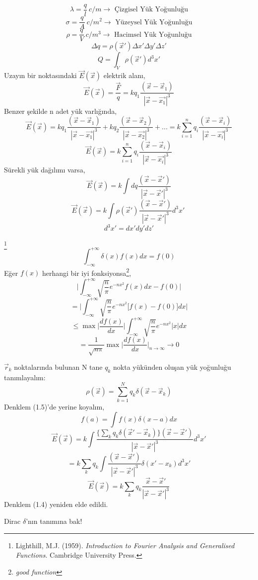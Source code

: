 \begin{theorem}
  \[  \lambda = \dfrac{q}{l} \ c/m  \rightarrow \textrm{ Çizgisel Yük Yoğunluğu}\] 
  \[  \sigma = \dfrac{q}{A} \ c/m^{2}  \rightarrow \textrm{ Yüzeysel Yük Yoğunluğu}\]
  \[  \rho = \dfrac{q}{V} \ c/m^{3} \rightarrow \textrm{ Hacimsel Yük Yoğunluğu} \]
  \[ \Delta q = \rho (\Vec{x}') \Delta x' \Delta y' \Delta z' \]
  \[ Q = \int_{V}  \rho (\Vec{x}') d^{3} x'  \]
Uzayın bir noktasındaki $\Vec{E} (\Vec{x})$ elektrik alanı,
 \[ \Vec{E} (\Vec{x}) = \dfrac{\Vec{F}}{q} = k q_{1} \dfrac{( \Vec{x} - \Vec{x}_{1})}{| \Vec{x} - \Vec{x_{1}}|^{3}} \]
Benzer şekilde n adet yük varlığında,
  \[ \Vec{E} (\Vec{x}) = k q_{1} \dfrac{( \Vec{x} - \Vec{x}_{1})}{| \Vec{x} - \Vec{x_{1}}|^{3}} + k q_{2} \dfrac{( \Vec{x} - \Vec{x}_{2})}{| \Vec{x} - \Vec{x_{2}}|^{3}} + ... =  k \sum_{i = 1}^{n} q_{i} \dfrac{( \Vec{x} - \Vec{x}_{i})}{| \Vec{x} - \Vec{x_{i}}|^{3}} \]
  \[ \Vec{E} (\Vec{x}) = k \sum_{i = 1}^{n} q_{i} \dfrac{( \Vec{x} - \Vec{x}_{i})}{| \Vec{x} - \Vec{x_{i}}|^{3}}\]
Sürekli yük dağılımı varsa,
\[   \Vec{E} (\Vec{x}) = k \int dq \dfrac{( \Vec{x} - \Vec{x}')}{| \Vec{x} - \Vec{x}'|^{3}}  \]
\[ \Vec{E} (\Vec{x}) = k \int \rho(\Vec{x}') \dfrac{( \Vec{x} - \Vec{x}')}{| \Vec{x} - \Vec{x}'|^{3}} d^{3} x' \ \tag{1.5}  \]
\[ d^{3} x' = dx' dy' dz' \]
\end{theorem}

\begin{definition} \footnote{Lighthill, M.J. (1959). \textit{Introduction to Fourier Analysis and Generalised Functions}. Cambridge University Press.}
\[ \int_{-\infty}^{+ \infty} \delta(x) f(x) dx = f (0) \]
Eğer $f(x)$ herhangi bir iyi fonksiyonsa\footnote{\textit{good function}},
\[ \Big| \int_{-\infty}^{+ \infty}  \sqrt{\dfrac{n}{\pi}} e^{-n x^{2}} f(x) dx - f(0) \Big| \]
\[ = \Big| \int_{-\infty}^{+ \infty}  \sqrt{\dfrac{n}{\pi}} e^{-n x^{2}} \big[ f(x) - f(0) \big] dx \Big|  \]
\[ \leq \max \Big| \dfrac{d f(x)}{dx} \Big| \int_{-\infty}^{+ \infty} \sqrt{\dfrac{n}{\pi}}  e^{-n x^{2}} |x| dx \]
\[ = \dfrac{1}{\sqrt{n \pi}} \max \Big| \dfrac{d f(x)}{dx} \Big|_{n \rightarrow \infty} \rightarrow 0 \]
\end{definition}

\begin{theorem}
$\Vec{r}_{k}$ noktalarında bulunan N tane $q_{k}$ nokta yükünden oluşan yük yoğunluğu tanımlayalım:
\[ \rho (\Vec{x}) = \sum_{k=1}^{N} q_{k} \delta (\Vec{x} - \Vec{x}_{k}) \tag{1.6} \]
Denklem (1.5)'de yerine koyalım,
\[ f(a) = \int f (x) \delta(x-a) dx \]
\[ \Vec{E} (\Vec{x}) = k \int \dfrac{\big\{ \sum_{k} q_{k} \delta(\Vec{x}' - \Vec{x}_{k}) \big\} ( \Vec{x} - \Vec{x}') }{| \Vec{x} - \Vec{x}'|^{3}} d^{3} x' \]
\[ = k \sum_{k} q_{k} \int \dfrac{ ( \Vec{x} - \Vec{x}')}{| \Vec{x} - \Vec{x}'|^{3}} \delta(x' - x_{k}) d^{3} x'\]
\[ \Vec{E} (\Vec{x}) = k \sum_{k} q_{k} \dfrac{\Vec{x} - \Vec{x}'}{| \Vec{x} - \Vec{x}'|^{3}} \]
Denklem (1.4) yeniden elde edildi.
\begin{note}
Dirac $\delta$'nın tanımına bak!
\end{note}
\end{theorem}

